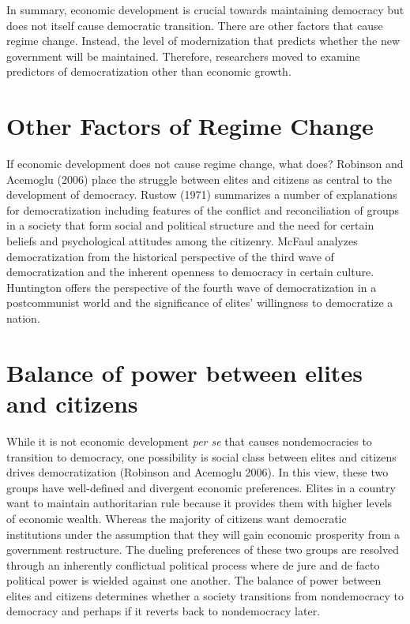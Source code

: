 \documentclass[12pt,]{article}
\begin{document}
In summary, economic development is crucial towards maintaining
democracy but does not itself cause democratic transition. There are
other factors that cause regime change. Instead, the level of
modernization that predicts whether the new government will be
maintained. Therefore, researchers moved to examine predictors of
democratization other than economic growth.

\hypertarget{other-factors-of-regime-change}{%
\section{Other Factors of Regime
Change}\label{other-factors-of-regime-change}}

If economic development does not cause regime change, what does?
Robinson and Acemoglu (2006) place the struggle between elites and
citizens as central to the development of democracy. Rustow (1971)
summarizes a number of explanations for democratization including
features of the conflict and reconciliation of groups in a society that
form social and political structure and the need for certain beliefs and
psychological attitudes among the citizenry. McFaul analyzes
democratization from the historical perspective of the third wave of
democratization and the inherent openness to democracy in certain
culture. Huntington offers the perspective of the fourth wave of
democratization in a postcommunist world and the significance of elites'
willingness to democratize a nation.

\hypertarget{balance-of-power-between-elites-and-citizens}{%
\section{Balance of power between elites and
citizens}\label{balance-of-power-between-elites-and-citizens}}

While it is not economic development \emph{per se} that causes
nondemocracies to transition to democracy, one possibility is social
class between elites and citizens drives democratization (Robinson and
Acemoglu 2006). In this view, these two groups have well-defined and
divergent economic preferences. Elites in a country want to maintain
authoritarian rule because it provides them with higher levels of
economic wealth. Whereas the majority of citizens want democratic
institutions under the assumption that they will gain economic
prosperity from a government restructure. The dueling preferences of
these two groups are resolved through an inherently conflictual
political process where de jure and de facto political power is wielded
against one another. The balance of power between elites and citizens
determines whether a society transitions from nondemocracy to democracy
and perhaps if it reverts back to nondemocracy later.
\end{document}
